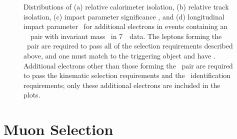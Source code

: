 \begin{figure}[h]
{        }
\caption[ Distributions of relative track and calorimeter isolation, \dzerosig\
and \zzero\ for additional electrons in events containing a dilepton pair with
mass \sstooos\ in 7~\tev\ data.]{Distributions of (a) relative calorimeter isolation, (b)
relative track isolation, (c) impact parameter significance \dzerosig,
and (d) longitudinal impact parameter \zzero\ for additional electrons in events
containing an \ossf\ \dilepton\ pair with
invariant mass \sstooos\ in 7~\tev\ data. The leptons forming the \dilepton\ pair are required to pass all of
the selection requirements described above, and one must match to the triggering
object and have \ptgt{25}. Additional electrons other than those forming the
\dilepton\ pair are required to pass
the kinematic selection requirements and the \loosePP\ identification
requirements; only these additional electrons are included in the plots.}
\label{fig:objsel-el}
\end{figure}

%

\section{Muon Selection}
\label{sec:objsel-mu}

